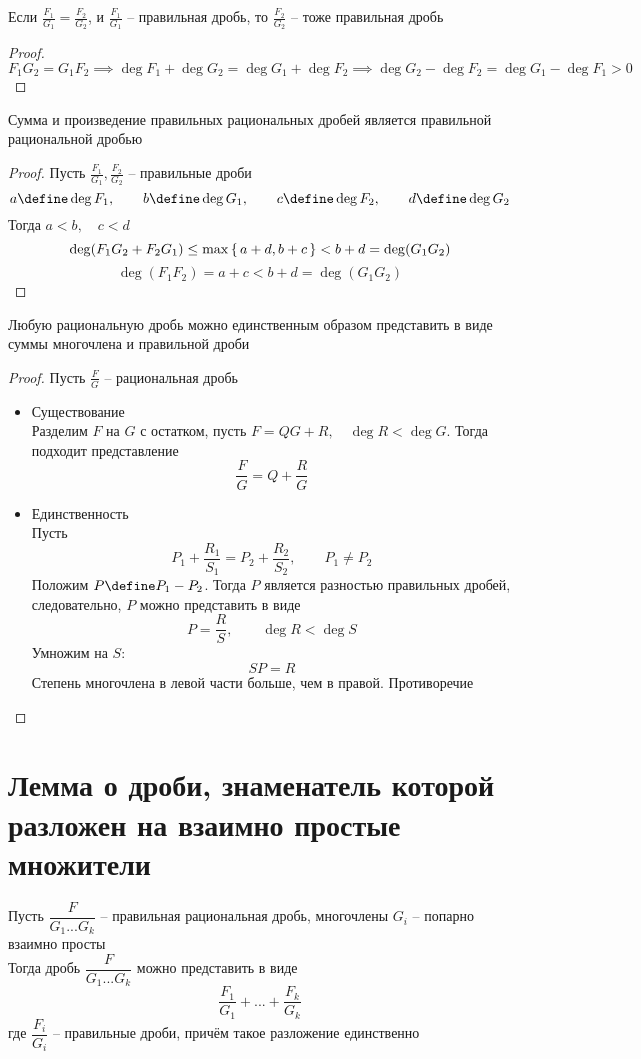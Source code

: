 \begin{props}
	\item Если $\frac{F_1}{G_1} = \frac{F_2}{G_2}$, и $\frac{F_1}{G_1}$ -- правильная дробь, то $\frac{F_2}{G_2}$ -- тоже правильная дробь
	\begin{proof}
		$ F_1G_2 = G_1F_2 \implies \deg F_1 + \deg G_2 = \deg G_1 + \deg F_2 \implies \deg G_2 - \deg F_2 = \deg G_1 - \deg F_1 > 0 $
	\end{proof}
	\item Сумма и произведение правильных рациональных дробей является правильной рациональной дробью
	\begin{proof}
		Пусть $\frac{F_1}{G_1}, \frac{F_2}{G_2}$ -- правильные дроби
		$$ a \define \deg F_1, \qquad b \define \deg G_1, \qquad c \define \deg F_2, \qquad d \define \deg G_2 $$
		Тогда $a < b, \quad c < d$
		$$ \deg(F_1G_2 + F_2G_1) \le \max\set{a + d, b + c} < b + d = \deg(G_1G_2) $$
		$$ \deg(F_1F_2) = a + c < b + d = \deg(G_1G_2) $$
	\end{proof}
	\item Любую рациональную дробь можно единственным образом представить в виде суммы многочлена и правильной дроби
	\begin{proof}
		Пусть $\frac{F}G$ -- рациональная дробь
		\begin{itemize}
			\item Существование \\
			Разделим $F$ на $G$ с остатком, пусть $F = QG + R, \quad \deg R < \deg G$. Тогда подходит представление
			$$ \frac{F}G = Q + \frac{R}G $$
			\item Единственность \\
			Пусть
			$$ P_1 + \frac{R_1}{S_1} = P_2 + \frac{R_2}{S_2}, \qquad P_1 \ne P_2 $$
			Положим $P \define P_1 - P_2$. Тогда $P$ является разностью правильных дробей, следовательно, $P$ можно представить в виде
			$$ P = \frac{R}S, \qquad \deg R < \deg S $$
			Умножим на $S$:
			$$ SP = R $$
			Степень многочлена в левой части больше, чем в правой. Противоречие
		\end{itemize}
	\end{proof}
\end{props}

\section{Лемма о дроби, знаменатель которой разложен на взаимно простые множители}

\begin{lemma}
	Пусть $\dfrac{F}{G_1...G_k}$ -- правильная рациональная дробь, многочлены $G_i$ -- попарно взаимно просты \\
	Тогда дробь $\dfrac{F}{G_1...G_k}$ можно представить в виде
	$$ \frac{F_1}{G_1} + ... + \frac{F_k}{G_k} $$
	где $\dfrac{F_i}{G_i}$ -- правильные дроби, причём такое разложение единственно
\end{lemma}

